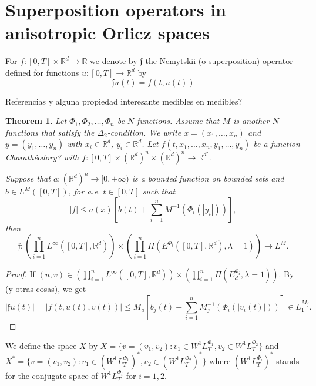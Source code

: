 \documentclass[twoside]{article}
\newtheorem{thm}{Theorem}[section]
\theoremstyle{remark}
\newcommand{\lmj}{L^{M}}
\newcommand{\rr}{\mathbb{R}}
\renewcommand{\leq}{\leqslant}
\begin{document}
\section{Superposition operators in anisotropic Orlicz spaces}


For $f:[0,T]\times \rr^d\to\rr$  we denote by $\mathfrak{f}$ the Nemytskii (o superposition) operator defined for functions $u:[0,T]\to\rr^d$ by 
\[\mathfrak{f}u(t)=f(t,u(t))\]

Referencias y alguna propiedad interesante medibles en medibles? \cite{krasnosel2011integral,KR}


\begin{thm}
Let $\Phi_1,\Phi_2,\dots,\Phi_n$ be $N$-functions. 
Assume that $M$ is another $N$-functions that satisfy the $\Delta_2$-condition. 
We write $x=(x_1,\dots,x_n)$  and $y=(y_1,\dots,y_n)$ with $x_i\in \rr^d$, $y_i\in \rr^d$.
Let $f(t,x_1,\ldots,x_n,y_1,\ldots,y_n)$ be a function Charath\'eodory? with $f:[0,T]\times {(\rr^d)}^n\times {(\rr^d)}^n \to \rr^{d'}$.

Suppose that $a:(\rr^d)^n\to [0,+\infty)$ is a bounded function on bounded sets and 
$b \in L^{M}([0,T])$, for a.e. $t \in [0, T]$ such that 
\begin{equation}\label{eq:condicion estru gral}
|f|\leq a(x)[ b(t)+\sum_{i=1}^{n} M^{-1}(\Phi_i(|y_i|))],
\end{equation}
then 
\[
\mathfrak{f}:\left(\prod\limits_{i=1}^n L^{\infty}([0,T],\rr^d)\right) \times \left(\prod\limits_{i=1}^n \Pi(E^{\Phi_i}([0,T],\rr^d),\lambda=1)\right)
\to \lmj.\]
\end{thm}

\begin{proof}
If $(u,v)\in \left(\prod\limits_{i=1}^n L^{\infty}([0,T],\rr^d)\right) \times \left(\prod\limits_{i=1}^n \Pi(E_d^{\Phi_i},\lambda=1)\right)$.
By \cite[ Thm. 17.6]{KR} (y otras cosas), we get 
 \[|\mathfrak{f}u(t)|=|f(t,u(t),v(t))| \leq 
M_a [b_j(t) +\sum_{i=1}^{n} M_j^{-1}(\Phi_i(|v_i(t)|))]
\in
 L_1^{M_j}.\]
\end{proof}

We define the space $X$ by
$X=\{v=(v_1,v_2):v_1 \in W^{1}L^{\Phi_1}_T,v_2\in W^{1}L^{\Phi_2}_T\}$
and 
$X^*=\{v=(v_1,v_2):v_1 \in (W^{1}L^{\Phi_1}_T)^*,v_2\in (W^{1}L^{\Phi_2}_T)^*\}$
where $(W^{1}L^{\Phi_i}_T)^*$ stands for the conjugate space of $W^{1}L^{\Phi_i}_T$ for $i=1,2$.
\end{document}
